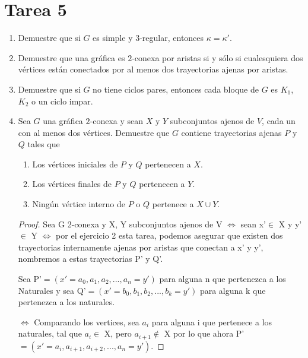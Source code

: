 \documentclass{article}
\begin{document}
\section*{\LARGE{Tarea 5}}
\begin{enumerate}
\item Demuestre que si $G$ es simple y $3$-regular, entonces $\kappa =
  \kappa'$.
\item Demuestre que una gr\'afica es $2$-conexa por aristas si y s\'olo si
  cualesquiera dos v\'ertices est\'an conectados por al menos dos trayectorias
  ajenas por aristas.
\item Demuestre que si $G$ no tiene ciclos pares, entonces cada bloque de $G$
  es $K_1$, $K_2$ o un ciclo impar.
\item Sea $G$ una gr\'afica $2$-conexa y sean $X$ y $Y$ subconjuntos ajenos de
  $V$, cada un con al menos dos v\'ertices.   Demuestre que $G$ contiene
  trayectorias ajenas $P$ y $Q$ tales que
  \begin{enumerate}
  \item Los v\'ertices iniciales de $P$ y $Q$ pertenecen a $X$.

  \item Los v\'ertices finales de $P$ y $Q$ pertenecen a $Y$.

  \item Ning\'un v\'ertice interno de $P$ o $Q$ pertenece a $X \cup Y$.
  \end{enumerate} 

  \begin{proof} 

    Sea G 2-conexa y X, Y subconjuntos ajenos de V $\Leftrightarrow$ sean x'$\in$ X y y'$\in$ Y $\Leftrightarrow$ por el ejercicio 2 esta tarea, podemos asegurar que existen dos trayectorias internamente ajenas por aristas que conectan a x' y y', nombremos a estas trayectorias P' y Q'.
    
    Sea P'$=(x'=a_0, a_1, a_2, ..., a_n = y')$ para alguna n que pertenezca a los Naturales y sea  Q'$=(x' =b_0, b_1, b_2, ..., b_k = y')$ para alguna k que pertenezca a los naturales.
    
    $\Leftrightarrow$ Comparando los vertices, sea $a_i$ para alguna i que pertenece a los naturales, tal que  $a_i \in$ X, pero  $a_{i+1} \notin$ X por lo que ahora P'$=(x'=a_i, a_{i+1}, a_{i+2}, ..., a_n = y')$.
    

\end{proof}
\end{enumerate}
\end{document}
